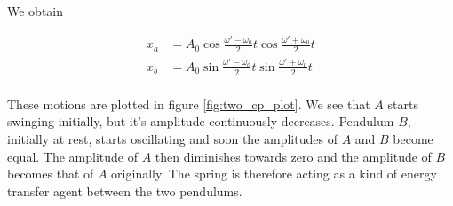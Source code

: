 \documentclass[a4paper,10pt]{article}
\begin{document}
We obtain

\begin{align*}
x_a &= A_0\cos{\frac{\omega\prime - \omega_0}{2}t}\cos{\frac{\omega\prime + \omega_0}{2}t}\\
x_b &= A_0\sin{\frac{\omega\prime - \omega_0}{2}t}\sin{\frac{\omega\prime + \omega_0}{2}t}\\
\end{align*}

These motions are plotted in figure \ref{fig:two_cp_plot}. We see that $A$ starts swinging initially, but it's amplitude continuously decreases. Pendulum $B$, initially
at rest, starts oscillating and soon the amplitudes of $A$ and $B$ become equal. The amplitude of $A$ then diminishes towards zero and the amplitude
of $B$ becomes that of $A$ originally. The spring is therefore acting as a kind of energy transfer agent between the two pendulums.

\begin{figure}[!h]
	\centering
\end{figure}%
\end{document}
